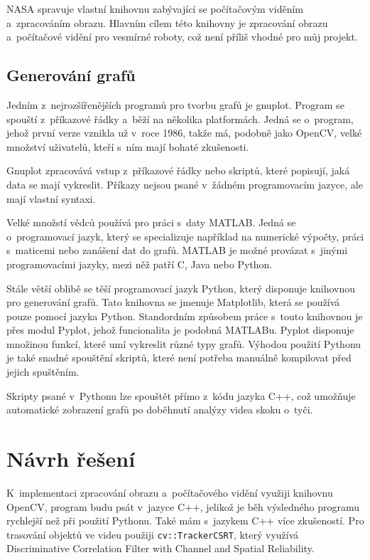 NASA spravuje vlastní knihovnu zabývající se počítačovým viděním a~zpracováním obrazu. Hlavním cílem této knihovny je zpracování obrazu a~počítačové vidění pro vesmírné roboty, což není příliš vhodné pro můj projekt.

\subsection{Generování grafů}

Jedním z~nejrozšířenějších programů pro tvorbu grafů je gnuplot. Program se spouští z~příkazové řádky a~běží na několika platformách. Jedná se o~program, jehož první verze vznikla už v~roce 1986, takže má, podobně jako OpenCV, velké množství uživatelů, kteří s~ním mají bohaté zkušenosti.

Gnuplot zpracovává vstup z~příkazové řádky nebo skriptů, které popisují, jaká data se mají vykreslit. Příkazy nejsou psané v~žádném programovacím jazyce, ale mají vlastní syntaxi.

Velké množstí vědců používá pro práci s~daty MATLAB. Jedná se o~programovací jazyk, který se specializuje například na numerické výpočty, práci s~maticemi nebo zanášení dat do grafů. MATLAB je možné provázat s~jinými programovacími jazyky, mezi něž patří C, Java nebo Python.

Stále větší oblibě se těší programovací jazyk Python, který disponuje knihovnou pro generování grafů. Tato knihovna se jmenuje Matplotlib, která se používá pouze pomocí jazyka Python. Standordním způsobem práce s~touto knihovnou je přes modul Pyplot, jehož funcionalita je podobná MATLABu. Pyplot disponuje množinou funkcí, které umí vykreslit různé typy grafů. Výhodou použití Pythonu je také snadné spouštění skriptů, které není potřeba manuálně kompilovat před jejich spuštěním.

Skripty psané v~Pythonu lze spouštět přímo z~kódu jazyka C++, což umožňuje automatické zobrazení grafů po doběhnutí analýzy videa skoku o~tyči.

\section{Návrh řešení}

K~implementaci zpracování obrazu a~počítačového vidění využiji knihovnu OpenCV, program budu psát v~jazyce C++, jelikož je běh výsledného programu rychlejší než při použití Pythonu. Také mám s~jazykem C++ více zkušeností. Pro trasování objektů ve videu použiji \texttt{cv::TrackerCSRT}, který využívá Discriminative Correlation Filter with Channel and Spatial Reliability.


